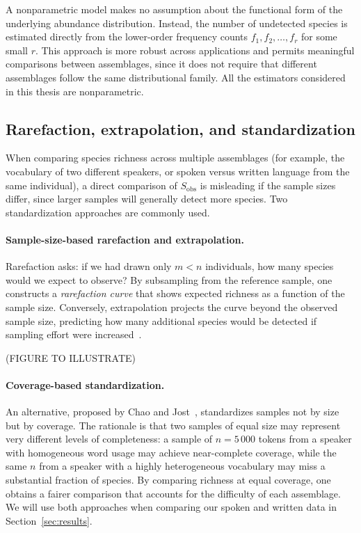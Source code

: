 \documentclass{article}
\begin{document}
A nonparametric model makes no assumption about the functional form of the underlying abundance distribution. Instead, the number of undetected species is estimated directly from the lower-order frequency counts $f_1, f_2, \ldots, f_r$ for some small $r$. This approach is more robust across applications and permits meaningful comparisons between assemblages, since it does not require that different assemblages follow the same distributional family. All the estimators considered in this thesis are nonparametric.\\

\subsection{Rarefaction, extrapolation, and standardization}

When comparing species richness across multiple assemblages (for example, the vocabulary of two different speakers, or spoken versus written language from the same individual), a direct comparison of $S_{\mathrm{obs}}$ is misleading if the sample sizes differ, since larger samples will generally detect more species. Two standardization approaches are commonly used.
 
\paragraph{Sample-size-based rarefaction and extrapolation.}
Rarefaction asks: if we had drawn only $m < n$ individuals, how many species would we expect to observe? By subsampling from the reference sample, one constructs a \emph{rarefaction curve} that shows expected richness as a function of the sample size. Conversely, extrapolation projects the curve beyond the observed sample size, predicting how many additional species would be detected if sampling effort were increased~\cite{colwell2012,chao2014inext}.

(FIGURE TO ILLUSTRATE)
 
\paragraph{Coverage-based standardization.}
An alternative, proposed by Chao and Jost~\cite{chaojost2012}, standardizes samples not by size but by coverage. The rationale is that two samples of equal size may represent very different levels of completeness: a sample of $n = 5\,000$ tokens from a speaker with homogeneous word usage may achieve near-complete coverage, while the same $n$ from a speaker with a highly heterogeneous vocabulary may miss a substantial fraction of species. By comparing richness at equal coverage, one obtains a fairer comparison that accounts for the difficulty of each assemblage. We will use both approaches when comparing our spoken and written data in Section~\ref{sec:results}.
\end{document}
